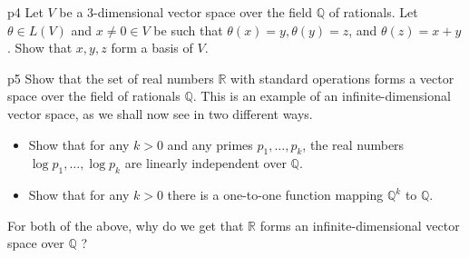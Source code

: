 \documentclass[a4paper, 11pt]{article}
\begin{document}

\begin{problem}{%
	}{p4%
	}
 Let $V$ be a 3-dimensional vector space over the field $\mathbb{Q}$ of rationals. Let $\theta \in L(V)$ and $x \neq 0 \in V$ be such that $\theta(x)=y, \theta(y)=z$, and $\theta(z)=x+y$. Show that $x, y, z$ form a basis of $V$.
\end{problem}
\solve{
	
}

\begin{problem}{%
}{p5%
}
Show that the set of real numbers $\mathbb{R}$ with standard operations forms a vector space over the field of rationals $\mathbb{Q}$. This is an example of an infinite-dimensional vector space, as we shall now see in two different ways.
\begin{itemize}
	\item Show that for any $k>0$ and any primes $p_1, \ldots, p_k$, the real numbers $\log p_1, \ldots, \log p_k$ are linearly independent over $\mathbb{Q}$.
	\item Show that for any $k>0$ there is a one-to-one function mapping $\mathbb{Q}^k$ to $\mathbb{Q}$.
\end{itemize}

For both of the above, why do we get that $\mathbb{R}$ forms an infinite-dimensional vector space over $\mathbb{Q}$ ?
\end{problem}
\solve{

}
\end{document}
